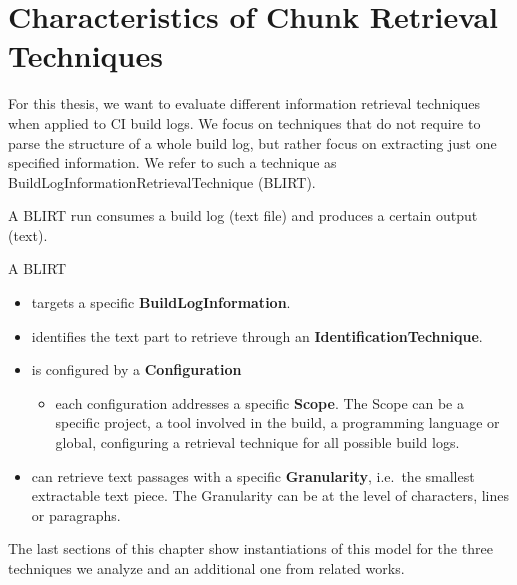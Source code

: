 \documentclass[\myrootdir/main.tex]{subfiles}
\begin{document}
\section{Characteristics of Chunk Retrieval Techniques}
\label{sec:blirt}
For this thesis, we want to evaluate different information retrieval techniques when applied to CI build logs.
We focus on techniques that do not require to parse the structure of a whole build log, but rather focus on extracting just one specified information.
We refer to such a technique as BuildLogInformationRetrievalTechnique (BLIRT).

A BLIRT run consumes a build log (text file) and produces a certain output (text).

A BLIRT
\begin{itemize}
	\item targets a specific \textbf{BuildLogInformation}.
	\item identifies the text part to retrieve through an \textbf{IdentificationTechnique}.
	\item is configured by a \textbf{Configuration}
	      \begin{itemize}
		      \item each configuration addresses a specific \textbf{Scope}.
		            The Scope can be a specific project, a tool involved in the build, a programming language or global, configuring a retrieval technique for all possible build logs.
	      \end{itemize}
	\item can retrieve text passages with a specific \textbf{Granularity}, i.e.\ the smallest extractable text piece.
	      The Granularity can be at the level of characters, lines or paragraphs.
\end{itemize}

The last sections of this chapter show instantiations of this model for the three techniques we analyze and an additional one from related works.

\end{document}
